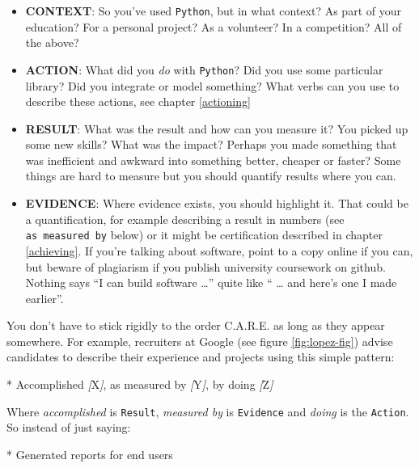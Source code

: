 \documentclass[
]{book}
\newenvironment{Shaded}{\begin{snugshade}}{\end{snugshade}}
\newcommand{\CommentTok}[1]{\textcolor[rgb]{0.56,0.35,0.01}{\textit{#1}}}
\newcommand{\NormalTok}[1]{#1}
\newcommand{\OtherTok}[1]{\textcolor[rgb]{0.56,0.35,0.01}{#1}}
\newcommand{\SpecialStringTok}[1]{\textcolor[rgb]{0.31,0.60,0.02}{#1}}
\providecommand{\tightlist}{%
  \setlength{\itemsep}{0pt}\setlength{\parskip}{0pt}}
\begin{document}
\begin{itemize}
\tightlist
\item
  \textbf{CONTEXT}: So you've used \texttt{Python}, but in what context? As part of your education? For a personal project? As a volunteer? In a competition? All of the above?
\item
  \textbf{ACTION}: What did you \emph{do} with \texttt{Python}? Did you use some particular library? Did you integrate or model something? What verbs can you use to describe these actions, see chapter \ref{actioning}
\item
  \textbf{RESULT}: What was the result and how can you measure it? You picked up some new skills? What was the impact? Perhaps you made something that was inefficient and awkward into something better, cheaper or faster? Some things are hard to measure but you should quantify results where you can.
\item
  \textbf{EVIDENCE}: Where evidence exists, you should highlight it. That could be a quantification, for example describing a result in numbers (see \texttt{as\ measured\ by} below) or it might be certification described in chapter \ref{achieving}. If you're talking about software, point to a copy online if you can, but beware of plagiarism if you publish university coursework on github. Nothing says ``I can build software \ldots{}'' quite like `` \ldots{} and here's one I made earlier''.
\end{itemize}

You don't have to stick rigidly to the order C.A.R.E. as long as they appear somewhere. For example, recruiters at Google (see figure \ref{fig:lopez-fig}) advise candidates to describe their experience and projects using this simple pattern:

\begin{Shaded}
\begin{Highlighting}[]
\SpecialStringTok{* }\NormalTok{Accomplished }\CommentTok{[}\OtherTok{X}\CommentTok{]}\NormalTok{, as measured by }\CommentTok{[}\OtherTok{Y}\CommentTok{]}\NormalTok{, by doing }\CommentTok{[}\OtherTok{Z}\CommentTok{]}
\end{Highlighting}
\end{Shaded}

Where \emph{accomplished} is \texttt{Result}, \emph{measured by} is \texttt{Evidence} and \emph{doing} is the \texttt{Action}. So instead of just saying:

\begin{Shaded}
\begin{Highlighting}[]
\SpecialStringTok{* }\NormalTok{Generated reports for end users}
\end{Highlighting}
\end{Shaded}
\end{document}
